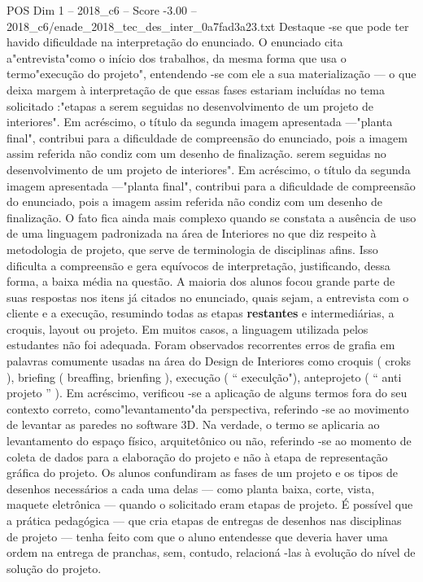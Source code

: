 \begin{textsample}{POS Dim 1 – 2018\_c6 – Score -3.00 – 2018\_c6/enade\_2018\_tec\_des\_inter\_0a7fad3a23.txt}
Destaque -se que pode ter havido dificuldade na interpretação do enunciado.
O enunciado cita a"entrevista"como o início dos trabalhos, da mesma forma que usa o termo"execução do projeto", entendendo -se com ele a sua materialização — o que deixa margem à interpretação de que essas fases estariam incluídas no tema solicitado :"etapas a serem seguidas no desenvolvimento de um projeto de interiores".
Em acréscimo, o título da segunda imagem apresentada —"planta final", contribui para a dificuldade de compreensão do enunciado, pois a imagem assim referida não condiz com um desenho de finalização. serem seguidas no desenvolvimento de um projeto de interiores".
Em acréscimo, o título da segunda imagem apresentada —"planta final", contribui para a dificuldade de compreensão do enunciado, pois a imagem assim referida não condiz com um desenho de finalização.
O fato fica ainda mais complexo quando se constata a ausência de uso de uma linguagem padronizada na área de Interiores no que diz respeito à metodologia de projeto, que serve de terminologia de disciplinas afins.
Isso dificulta a compreensão e gera equívocos de interpretação, justificando, dessa forma, a baixa média na questão.
A maioria dos alunos focou grande parte de suas respostas nos itens já citados no enunciado, quais sejam, a entrevista com o cliente e a execução, resumindo todas as etapas \textbf{restantes} e intermediárias, a croquis, layout ou projeto.
Em muitos casos, a linguagem utilizada pelos estudantes não foi adequada.
Foram observados recorrentes erros de grafia em palavras comumente usadas na área do Design de Interiores como croquis ( croks ), briefing ( breaffing, brienfing ), execução ( “ execulção"), anteprojeto ( “ anti projeto ” ).
Em acréscimo, verificou -se a aplicação de alguns termos fora do seu contexto correto, como"levantamento"da perspectiva, referindo -se ao movimento de levantar as paredes no software 3D.
Na verdade, o termo se aplicaria ao levantamento do espaço físico, arquitetônico ou não, referindo -se ao momento de coleta de dados para a elaboração do projeto e não à etapa de representação gráfica do projeto.
Os alunos confundiram as fases de um projeto e os tipos de desenhos necessários a cada uma delas — como planta baixa, corte, vista, maquete eletrônica — quando o solicitado eram etapas de projeto.
É possível que a prática pedagógica — que cria etapas de entregas de desenhos nas disciplinas de projeto — tenha feito com que o aluno entendesse que deveria haver uma ordem na entrega de pranchas, sem, contudo, relacioná -las à evolução do nível de solução do projeto.

\end{textsample}

